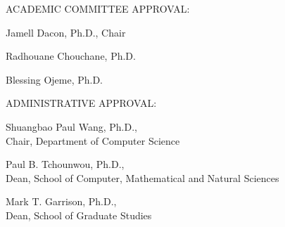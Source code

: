 \begin{frontmatterpage}
  \vspace{0.8in}
  \begingroup\RaggedRight\doublespacing\setlength{\parindent}{0pt}
  ACADEMIC COMMITTEE APPROVAL:\par
  \begingroup\leftskip=2in
  Jamell Dacon, Ph.D., Chair\par
  Radhouane Chouchane, Ph.D.\par
  Blessing Ojeme, Ph.D.\par
  \endgroup
  \vspace{0.3in}
  ADMINISTRATIVE APPROVAL:\par
  \begingroup\leftskip=2in
  Shuangbao Paul Wang, Ph.D.,\\Chair, Department of Computer Science\par
  Paul B. Tchounwou, Ph.D.,\\Dean, School of Computer, Mathematical and Natural Sciences\par
  Mark T. Garrison, Ph.D.,\\Dean, School of Graduate Studies\par
  \endgroup
  \endgroup
\end{frontmatterpage}
